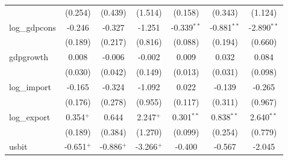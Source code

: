 \begin{tabular}{lcccccc}
                                          & (0.254)                                     & (0.439)                   & (1.514)                       & (0.158)                                     & (0.343)                   & (1.124)\\   
   log\_gdpcons                           & -0.246                                      & -0.327                    & -1.251                        & -0.339$^{**}$                               & -0.881$^{**}$             & -2.890$^{**}$\\   
                                          & (0.189)                                     & (0.217)                   & (0.816)                       & (0.088)                                     & (0.194)                   & (0.660)\\   
   gdpgrowth                              & 0.008                                       & -0.006                    & -0.002                        & 0.009                                       & 0.032                     & 0.084\\   
                                          & (0.030)                                     & (0.042)                   & (0.149)                       & (0.013)                                     & (0.031)                   & (0.098)\\   
   log\_import                            & -0.165                                      & -0.324                    & -1.092                        & 0.022                                       & -0.139                    & -0.265\\   
                                          & (0.176)                                     & (0.278)                   & (0.955)                       & (0.117)                                     & (0.311)                   & (0.967)\\   
   log\_export                            & 0.354$^{+}$                                 & 0.644                     & 2.247$^{+}$                   & 0.301$^{**}$                                & 0.838$^{**}$              & 2.640$^{**}$\\   
                                          & (0.189)                                     & (0.384)                   & (1.270)                       & (0.099)                                     & (0.254)                   & (0.779)\\   
   usbit                                  & -0.651$^{+}$                                & -0.886$^{+}$              & -3.266$^{+}$                  & -0.400                                      & -0.567                    & -2.045\\   

\end{tabular}
